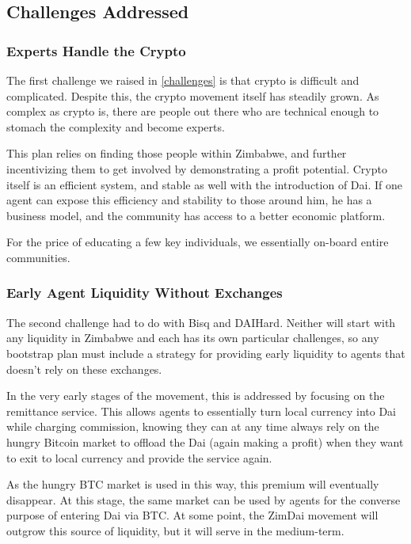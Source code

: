 \documentclass{article}
\begin{document}
\subsection{Challenges Addressed} \label{challenges addressed}

\subsubsection{Experts Handle the Crypto} \label{experts}

The first challenge we raised in \ref{challenges} is that crypto is difficult and complicated. Despite this, the crypto movement itself has steadily grown. As complex as crypto is, there are people out there who are technical enough to stomach the complexity and become experts.

This plan relies on finding those people within Zimbabwe, and further incentivizing them to get involved by demonstrating a profit potential. Crypto itself is an efficient system, and stable as well with the introduction of Dai. If one agent can expose this efficiency and stability to those around him, he has a business model, and the community has access to a better economic platform.

For the price of educating a few key individuals, we essentially on-board entire communities.

\subsubsection{Early Agent Liquidity Without Exchanges} \label{early liquidity}

The second challenge had to do with Bisq and DAIHard. Neither will start with any liquidity in Zimbabwe and each has its own particular challenges, so any bootstrap plan must include a strategy for providing early liquidity to agents that doesn't rely on these exchanges.

In the very early stages of the movement, this is addressed by focusing on the remittance service. This allows agents to essentially turn local currency into Dai while charging commission, knowing they can at any time always rely on the hungry Bitcoin market to offload the Dai (again making a profit) when they want to exit to local currency and provide the service again.

As the hungry BTC market is used in this way, this premium will eventually disappear. At this stage, the same market can be used by agents for the converse purpose of entering Dai via BTC. At some point, the ZimDai movement will outgrow this source of liquidity, but it will serve in the medium-term.
\end{document}
